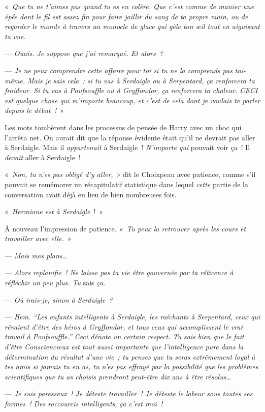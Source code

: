 «~\emph{Que tu ne t'aimes pas quand tu es en colère. Que c'est comme de manier une épée dont le fil est assez fin pour faire jaillir du sang de ta propre main, ou de regarder le monde à travers un monocle de glace qui gèle ton œil tout en aiguisant ta vue.}

--- \emph{Ouais. Je suppose que j'ai remarqué. Et alors~?}

--- \emph{Je ne peux comprendre cette affaire pour toi si tu ne la comprends pas toi-même. Mais je sais cela~: si tu vas à Serdaigle ou à Serpentard, ça renforcera ta froideur. Si tu vas à Poufsouffle ou à Gryffondor, ça renforcera ta chaleur. CECI est quelque chose qui m'importe beaucoup, et c'est de cela dont je voulais te parler depuis le début~!}~»

Les mots tombèrent dans les processus de pensée de Harry avec un choc qui l'arrêta net. On aurait dit que la réponse évidente était qu'il ne devrait pas aller à Serdaigle. Mais il \emph{appartenait} à Serdaigle~! \emph{N'importe qui} pouvait voir ça~! Il \emph{devait} aller à Serdaigle~!

«~\emph{Non, tu n'es pas obligé d'y aller,}~» dit le Choixpeau avec patience, comme s'il pouvait se remémorer un récapitulatif statistique dans lequel \emph{cette} partie de la conversation avait déjà eu lieu de bien nombreuses fois.

«~\emph{Hermione est à Serdaigle}~!~»

À nouveau l'impression de patience. \emph{«~Tu peux la retrouver après les cours et travailler avec elle.}~»

--- \emph{Mais mes plans…}

--- \emph{Alors replanifie~! Ne laisse pas ta vie être gouvernée par ta réticence à réfléchir un peu plus. Tu} sais \emph{ça.}

--- \emph{Où irais-je, sinon à Serdaigle~?}

--- \emph{Hem. “Les enfants intelligents à Serdaigle, les méchants à Serpentard, ceux qui rêvaient d'être des héros à Gryffondor, et tous ceux qui accomplissent le vrai travail à Poufsouffle.” Ceci dénote un certain respect. Tu sais bien que le fait d'être Consciencieux est tout aussi importante que l'intelligence pure dans la détermination du résultat d'une vie~; tu penses que tu seras extrêmement loyal à tes amis si jamais tu en as, tu n'es pas effrayé par la possibilité que les problèmes scientifiques que tu as choisis prendront peut-être dix ans à être résolus…}

--- \emph{Je suis paresseux~! Je déteste travailler~! Je déteste le labeur sous toutes ses formes~! Des raccourcis intelligents, ça c'est moi~!}

